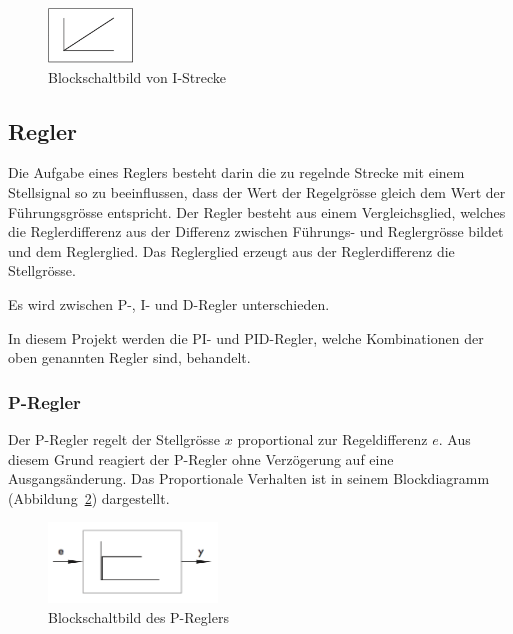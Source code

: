 \begin{figure}[h!, width=\pagewidth]
    \centering
    \includegraphics[width=0.2\textwidth]{images/IStrecke}
    \caption{Blockschaltbild von I-Strecke}
    \label{fig:IStrecke}
\end{figure}


\subsection{Regler}

Die Aufgabe  eines Reglers  besteht darin  die zu  regelnde Strecke  mit einem
Stellsignal  so  zu  beeinflussen,  dass der  Wert  der  Regelgr\"osse  gleich
dem  Wert  der F\"uhrungsgr\"osse  entspricht. Der  Regler  besteht aus  einem
Vergleichsglied,  welches  die  Reglerdifferenz  aus  der  Differenz  zwischen
F\"uhrungs-  und Reglergr\"osse  bildet und  dem Reglerglied. Das  Reglerglied
erzeugt aus der Reglerdifferenz die Stellgr\"osse.

Es wird zwischen P-, I- und D-Regler unterschieden.

In diesem Projekt werden die PI- und PID-Regler, welche Kombinationen der oben
genannten Regler sind, behandelt.

\subsubsection*{P-Regler}
Der  P-Regler regelt  der  Stellgr\"osse $x$  proportional zur  Regeldifferenz
$e$. Aus  diesem  Grund reagiert  der  P-Regler  ohne Verz\"ogerung  auf  eine
Ausgangs\"anderung. Das  Proportionale Verhalten  ist in  seinem Blockdiagramm
(Abbildung~\ref{fig:PRegler}) dargestellt.

\begin{figure}[h!, width=\pagewidth]
    \centering
    \includegraphics[width=0.4\textwidth]{images/PRegler}
    \caption{Blockschaltbild des P-Reglers}
    \label{fig:PRegler}
\end{figure}

